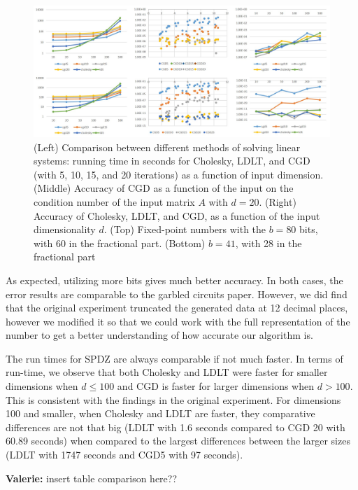 \documentclass{article}
\theoremstyle{plain}
\theoremstyle{definition}
\theoremstyle{remark}
\newcommand{\vc}[1]{{\textcolor{lred}{\textbf{Valerie:} #1}}}
\begin{document}
\begin{figure}[h]
  \includegraphics[width=\linewidth]{results.jpg}
  \caption{(Left) Comparison between different methods of solving linear systems: running time in seconds for Cholesky, LDLT, and CGD (with 5, 10, 15, and 20 iterations) as a function of input dimension. (Middle) Accuracy of CGD as a function of the input on the condition number of the input matrix $A$ with $d = 20$. (Right) Accuracy of Cholesky, LDLT, and CGD, as a function of the input dimensionality $d$. (Top) Fixed-point numbers with the $b = 80$ bits, with 60 in the fractional part. (Bottom) $b = 41$, with 28 in the fractional part}
  \label{fig:result1}
\end{figure}

As expected, utilizing more bits gives much better accuracy. In both cases, the error results are comparable to the garbled circuits paper. However, we did find that the original experiment truncated the generated data at 12 decimal places, however we modified it so that we could work with the full representation of the number to get a better understanding of how accurate our algorithm is.  

The run times for SPDZ are always comparable if not much faster. In terms of run-time, we observe that both Cholesky and LDLT were faster for smaller dimensions when $d \leq 100$ and CGD is faster for larger dimensions when $d > 100$. This is consistent with the findings in the original experiment. For dimensions 100 and smaller, when Cholesky and LDLT are faster, they comparative differences are not that big (LDLT with 1.6 seconds compared to CGD 20 with 60.89 seconds) when compared to the largest differences between the larger sizes (LDLT with 1747 seconds and CGD5 with 97 seconds).

\vc{insert table comparison here??}
\end{document}

